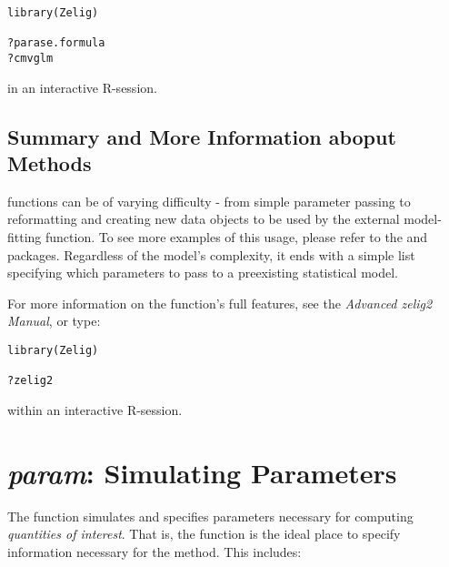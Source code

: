 \begin{verbatim}
library(Zelig)

?parase.formula
?cmvglm
\end{verbatim}

in an interactive R-session.


\subsection{Summary and More Information aboput  Methods}

 functions can be of varying difficulty - from simple parameter passing to reformatting and creating new data objects to be used by the external model-fitting function. To see more examples of this usage, please refer to the  and  packages. Regardless of the model's complexity, it ends with a simple list specifying which parameters to pass to a preexisting statistical model.

For more information on the  function's full features, see
the \emph{Advanced zelig2 Manual}, or type:

\begin{verbatim}
library(Zelig)

?zelig2
\end{verbatim}

within an interactive R-session.



\section{\emph{param}: Simulating Parameters}\label{section:param}


The  function simulates and specifies parameters necessary for computing
\emph{quantities of interest}. That is, the  function is the ideal place
to specify information necessary for the  method. This includes:

